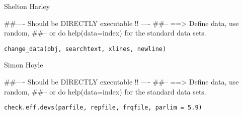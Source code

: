 \documentclass[a4paper]{book}
\begin{document}
%
\begin{Author}\relax
Shelton Harley

\end{Author}
%
\begin{Examples}
\begin{ExampleCode}
##---- Should be DIRECTLY executable !! ----
##-- ==>  Define data, use random,
##--	or do  help(data=index)  for the standard data sets.

\end{ExampleCode}
\end{Examples}
%
\begin{Usage}
\begin{verbatim}
change_data(obj, searchtext, xlines, newline)
\end{verbatim}
\end{Usage}
%
\begin{Arguments}
\begin{ldescription}
\item[\code{obj}] 


\item[\code{searchtext}] 


\item[\code{xlines}] 


\item[\code{newline}] 


\end{ldescription}
\end{Arguments}
%
\begin{Author}\relax
Simon Hoyle

\end{Author}
%
\begin{Examples}
\begin{ExampleCode}
##---- Should be DIRECTLY executable !! ----
##-- ==>  Define data, use random,
##--	or do  help(data=index)  for the standard data sets.

\end{ExampleCode}
\end{Examples}
%
\begin{Usage}
\begin{verbatim}
check.eff.devs(parfile, repfile, frqfile, parlim = 5.9)
\end{verbatim}
\end{Usage}
\end{document}
